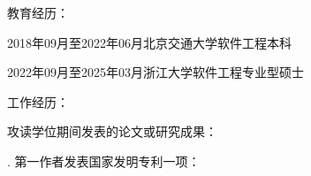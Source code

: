 \cleardoublepage
{}

\noindent 教育经历：

2018年09月至2022年06月\hspace{1em}北京交通大学\hspace{1em}软件工程\hspace{1em}本科

2022年09月至2025年03月\hspace{1em}浙江大学\hspace{3em}软件工程\hspace{1em}专业型硕士

\bigskip

\noindent 工作经历：


\bigskip

\noindent 攻读学位期间发表的论文或研究成果：

. 第一作者发表国家发明专利一项：
